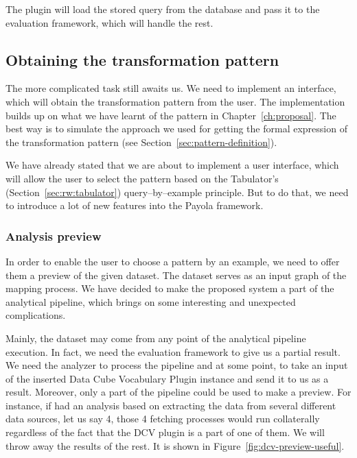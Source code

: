 The plugin will load the stored query from the database and pass it to the 
evaluation framework, which will handle the rest.

\subsection{Obtaining the transformation pattern}
The more complicated task still awaits us. We need to implement an interface, 
which will obtain the transformation pattern from the user. The implementation 
builds up on what we have learnt of the pattern in Chapter~\ref{ch:proposal}.
The best way is to simulate the 
approach we used for getting the formal expression of the transformation pattern
(see Section~\ref{sec:pattern-definition}).

We have already stated that we are about to implement a user interface, which 
will allow the user to select the pattern based on the Tabulator's (Section~\ref{sec:rw:tabulator})
query--by--example principle. But to do that, we need to introduce a lot of new 
features into the Payola framework.

\subsubsection{Analysis preview}
In order to enable the user to choose a pattern by an example, we need to offer them a preview
of the given dataset. The dataset serves as an input graph of the mapping process. 
We have decided to make the proposed system a part of the analytical 
pipeline, which brings on some interesting and unexpected complications.

Mainly, the dataset may come from any point of the analytical pipeline execution. In 
fact, we need the evaluation framework to give us a partial result. We need the 
analyzer to process the pipeline and at some point, to take an input of the 
inserted Data Cube Vocabulary Plugin instance and send it to us as a result. 
Moreover, only a part of the pipeline could be used to make a preview. For instance, if had an analysis
based on extracting the data from several different data sources, 
let us say 4, those 4 fetching processes would run collaterally regardless of the 
fact that the DCV plugin is a part of one of them. We will throw away the 
results of the rest. It is shown in Figure~\ref{fig:dcv-preview-useful}.

